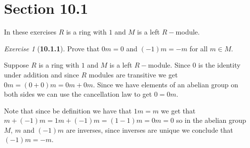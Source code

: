 \documentclass[12pt]{amsart}
\makeatletter
\theoremstyle{remark}
\newtheorem*{exercise}{Exercise}%
\renewenvironment{proof}[1][\proofname]{\par\doublespacing
  \pushQED{\qed}%
  \normalfont \topsep6\p@\@plus6\p@\relax
  \list{}{%
    \settowidth{\leftmargin}{\itshape\proofname:\hskip\labelsep}%
    \setlength{\labelwidth}{0pt}%
    \setlength{\itemindent}{-\leftmargin}%
  }%
  \item[\hskip\labelsep\itshape#1\@addpunct{:}]\ignorespaces
}{%
  \popQED\endlist\@endpefalse
  \singlespacing
}
\theoremstyle{mycomment}
\makeatother
\begin{document}
\thispagestyle{fancy}
\author{Coordinator: Coordinator's Name}








\section*{\textbf{Section 10.1}}
In these exercises $R$ is a ring with $1$ and $M$ is a left $R-$module. 
\begin{exercise}[\textbf{10.1.1}] Prove that $0m = 0$ and $(-1)m = -m$ for all $m \in M$.
  \begin{proof} Suppose $R$ is a ring with $1$ and $M$ is a left $R-$module. Since $0$ is the identity 
    under addition and since $R$ modules are transitive we get $0m = (0 + 0)m = 0m + 0m$. Since we have 
    elements of an abelian group on both sides we can use the cancellation law to get $0 = 0m$. 

    Note that since be definition we have that $1m = m$ we get that $m + (-1)m = 1m + (-1)m = (1 - 1)m = 0m = 0$
    so in the abelian group $M$, $m$ and $(-1)m$ are inverses, since inverses are unique we conclude that $(-1)m = -m$.
  \end{proof}
\end{exercise}
\vspace{.5in}
\end{document}
